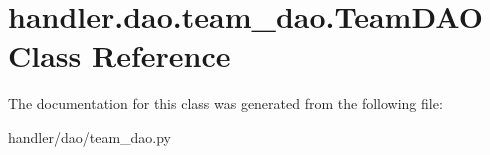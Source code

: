 \hypertarget{classhandler_1_1dao_1_1team__dao_1_1_team_d_a_o}{}\section{handler.\+dao.\+team\+\_\+dao.\+Team\+D\+AO Class Reference}
\label{classhandler_1_1dao_1_1team__dao_1_1_team_d_a_o}


The documentation for this class was generated from the following file\+:\begin{DoxyCompactItemize}
\item 
handler/dao/team\+\_\+dao.\+py\end{DoxyCompactItemize}
